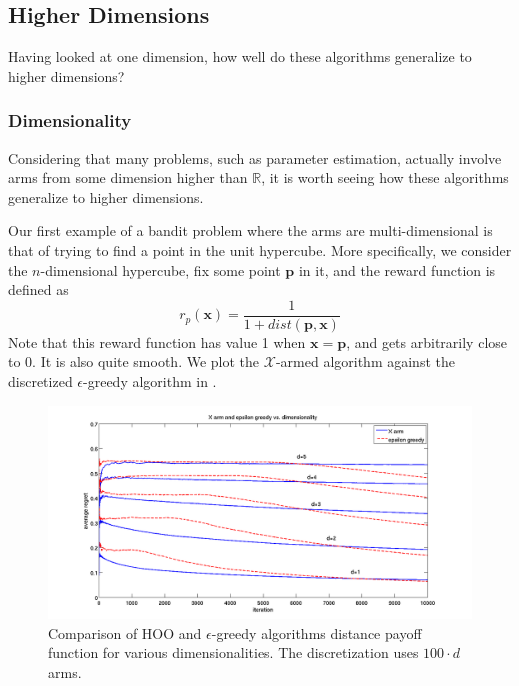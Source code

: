 \subsection{Higher Dimensions}
Having looked at one dimension, how well do these algorithms 
generalize to higher dimensions?

\subsubsection{Dimensionality}
Considering that many problems, such as parameter estimation, actually
involve arms from some dimension higher than $\mathbb{R}$, it is
worth seeing how these algorithms generalize to higher dimensions.

Our first example of a bandit problem where the arms are
multi-dimensional is that of trying to find a point in the unit hypercube.
More specifically, we consider the $n$-dimensional hypercube, fix some
point $\mathbf{p}$ in it, and the reward function is defined as
\[
	r_p(\mathbf{x}) = \frac{1}{1 + dist(\mathbf{p}, \mathbf{x})}
\]
Note that this reward function has value 1 when $\mathbf{x} =
\mathbf{p}$, and gets arbitrarily close to 0.  It is also quite
smooth.  We plot the $\mathcal{X}$-armed algorithm against the
discretized $\epsilon$-greedy algorithm in .

\begin{figure}[!ht]
  \begin{center}
    \includegraphics[width=\figwidth]{figures/dimensionComparison}
     \caption{Comparison of HOO and $\epsilon$-greedy algorithms
       distance payoff function for various dimensionalities. The
       discretization uses $100 \cdot d$ arms.}
     \label{fig:smoothness}
  \end{center}
\end{figure}

